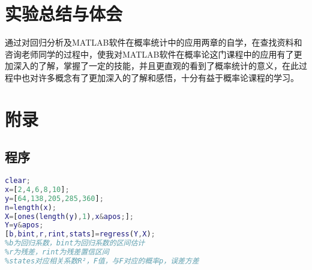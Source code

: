 \documentclass[UTF8,12pt,a4paper]{article}
\begin{document}
\section{实验总结与体会}
通过对回归分析及MATLAB软件在概率统计中的应用两章的自学，在查找资料和咨询老师同学的过程中，使我对MATLAB软件在概率论这门课程中的应用有了更加深入的了解，掌握了一定的技能，并且更直观的看到了概率统计的意义，在此过程中也对许多概念有了更加深入的了解和感悟，十分有益于概率论课程的学习。

\begin{thebibliography}{2}
\end{thebibliography}



\section*{附录}

\subsection{程序}
\begin{lstlisting}[language={Matlab},morekeywords={regress}]
clear;
x=[2,4,6,8,10];
y=[64,138,205,285,360];
n=length(x);
X=[ones(length(y),1),x&apos;];
Y=y&apos;
[b,bint,r,rint,stats]=regress(Y,X);
%b为回归系数，bint为回归系数的区间估计
%r为残差，rint为残差置信区间
%states对应相关系数R²，F值，与F对应的概率p，误差方差
\end{lstlisting}
\end{document}
